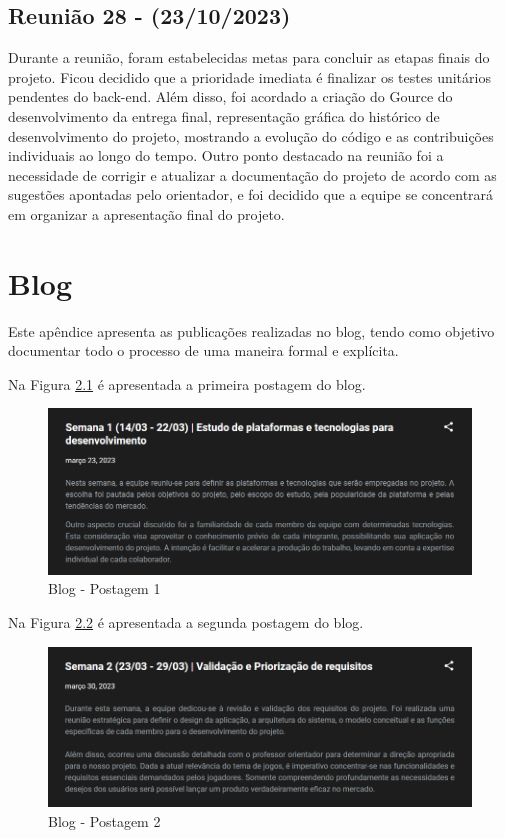\begin{apendicesenv}
\section{Reunião 28 - (23/10/2023)}
Durante a reunião, foram estabelecidas metas para concluir as etapas finais do projeto. Ficou decidido que a prioridade imediata é finalizar os testes unitários pendentes do back-end. Além disso, foi acordado a criação do Gource do desenvolvimento da entrega final, representação gráfica do histórico de desenvolvimento do projeto, mostrando a evolução do código e as contribuições individuais ao longo do tempo. Outro ponto destacado na reunião foi a necessidade de corrigir e atualizar a documentação do projeto de acordo com as sugestões apontadas pelo orientador, e foi decidido que a equipe se concentrará em organizar a apresentação final do projeto.

\chapter{Blog}
\label{postagens-blog}

Este apêndice apresenta as publicações realizadas no blog, tendo como objetivo documentar todo o processo de uma maneira formal e explícita.

Na Figura \ref{fig:109} é apresentada a primeira postagem do blog.

\begin{figure}[H]
	\centering
	\includegraphics[scale=0.68]{./imagens/Blog1.png}
	\caption{Blog - Postagem 1}
    \label{fig:109}
\end{figure}

Na Figura \ref{fig:110} é apresentada a segunda postagem do blog.

\begin{figure}[H]
	\centering
	\includegraphics[scale=0.68]{./imagens/Blog2.png}
	\caption{Blog - Postagem 2}
    \label{fig:110}
\end{figure}
\pagebreak


\end{apendicesenv}
